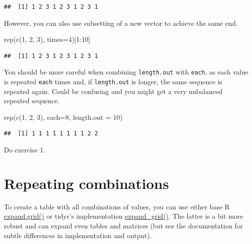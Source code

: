 \documentclass[
]{book}
\newenvironment{Shaded}{\begin{snugshade}}{\end{snugshade}}
\newcommand{\AttributeTok}[1]{\textcolor[rgb]{0.77,0.63,0.00}{#1}}
\newcommand{\DecValTok}[1]{\textcolor[rgb]{0.00,0.00,0.81}{#1}}
\newcommand{\FunctionTok}[1]{\textcolor[rgb]{0.00,0.00,0.00}{#1}}
\newcommand{\NormalTok}[1]{#1}
\newcommand{\SpecialCharTok}[1]{\textcolor[rgb]{0.00,0.00,0.00}{#1}}
\begin{document}
\begin{verbatim}
##  [1] 1 2 3 1 2 3 1 2 3 1
\end{verbatim}

However, you can also use subsetting of a new vector to achieve the same end.

\begin{Shaded}
\begin{Highlighting}[]
\FunctionTok{rep}\NormalTok{(}\FunctionTok{c}\NormalTok{(}\DecValTok{1}\NormalTok{, }\DecValTok{2}\NormalTok{, }\DecValTok{3}\NormalTok{), }\AttributeTok{times=}\DecValTok{4}\NormalTok{)[}\DecValTok{1}\SpecialCharTok{:}\DecValTok{10}\NormalTok{]}
\end{Highlighting}
\end{Shaded}

\begin{verbatim}
##  [1] 1 2 3 1 2 3 1 2 3 1
\end{verbatim}

You should be more careful when combining \texttt{length.out} with \texttt{each}, as each value is repeated \texttt{each} times and, if \texttt{length.out} is longer, the same sequence is repeated again. Could be confusing and you might get a very unbalanced repeated sequence.

\begin{Shaded}
\begin{Highlighting}[]
\FunctionTok{rep}\NormalTok{(}\FunctionTok{c}\NormalTok{(}\DecValTok{1}\NormalTok{, }\DecValTok{2}\NormalTok{, }\DecValTok{3}\NormalTok{), }\AttributeTok{each=}\DecValTok{8}\NormalTok{, }\AttributeTok{length.out =} \DecValTok{10}\NormalTok{)}
\end{Highlighting}
\end{Shaded}

\begin{verbatim}
##  [1] 1 1 1 1 1 1 1 1 2 2
\end{verbatim}

Do exercise 1.

\hypertarget{repeating-combinations}{%
\section{Repeating combinations}\label{repeating-combinations}}

To create a table with all combinations of values, you can use either base R \href{https://stat.ethz.ch/R-manual/R-devel/library/base/html/expand.grid.html}{expand.grid()} or tidyr's implementation \href{https://tidyr.tidyverse.org/reference/expand_grid.html}{expand\_grid()}. The latter is a bit more robust and can expand even tables and matrices (but see the documentation for subtle differences in implementation and output).
\end{document}
